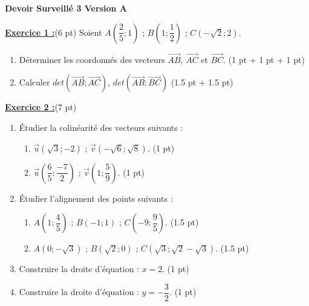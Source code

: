 \documentclass[12pt,a4paper]{article}
\begin{document}
\pagestyle{fancy}
\fancyhf{} %


\begin{center}
    \textbf{\Large  Devoir Surveillé 3 Version A}
\end{center}

\underline{\large\textbf{Exercice 1 :}}(6 pt)
Soient $A\left(\dfrac{2}{5};1\right)$ ; $B\left(1;\dfrac{1}{2}\right)$ ; $C(-\sqrt{2}; 2)$.
\begin{enumerate}
	\item Déterminer les coordonnés des vecteurs $\overrightarrow{AB}$, $\overrightarrow{AC}$ et $\overrightarrow{BC}$. (1 pt + 1 pt + 1 pt)
	\item Calculer $det(\overrightarrow{AB}; \overrightarrow{AC})$, $det(\overrightarrow{AB}; \overrightarrow{BC})$ (1.5 pt + 1.5 pt)
\end{enumerate}

\underline{\large\textbf{Exercice 2 :}}(7 pt)
\begin{enumerate}
	\item Étudier la colinéarité des vecteurs suivants :
		\begin{enumerate}
			\item $\vec{u}(\sqrt{3};-2)$ ; $\vec{v}(-\sqrt{6}; \sqrt{8})$. (1 pt)
			\item $\vec{u}\left(\dfrac{6}{5};\dfrac{-7}{2}\right)$ ; $\vec{v}\left(1; \dfrac{5}{9}\right)$. (1 pt)
		\end{enumerate}
	\item Étudier l'alignement des points suivants :
		\begin{enumerate}
			\item $A\left(1;\dfrac{4}{5}\right)$ ; $B(-1;1)$ ; $C\left(-9;\dfrac{9}{5}\right)$. (1.5 pt)
			\item $A(0;-\sqrt{3})$ ; $B(\sqrt{2};0)$ ; $C\left(\sqrt{3};\sqrt{2} - \sqrt{3}\right)$. (1.5 pt)
		\end{enumerate}
	\item Construire la droite d'équation : $x = 2$. (1 pt)
	\item Construire la droite d'équation : $y = -\dfrac{3}{2}$. (1 pt)
\end{enumerate}
\end{document}
